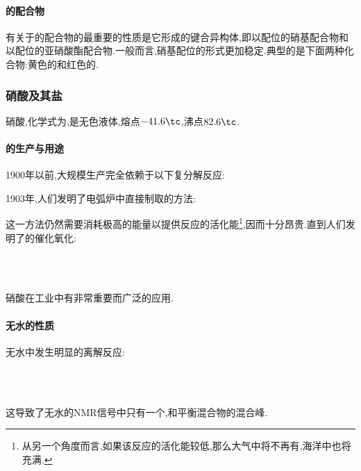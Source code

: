 \documentclass{ctexbook}
\begin{document}
\paragraph{的配合物}
有关于的配合物的最重要的性质是它形成的键合异构体,即以配位的硝基配合物和以配位的亚硝酸酯配合物.一般而言,硝基配位的形式更加稳定.典型的是下面两种化合物:黄色的和红色的.

\subsubsection{硝酸及其盐}
\begin{substance}[\ce{HNO3}]
    硝酸,化学式为,是无色液体,熔点$-41.6\tc$,沸点$82.6\tc$.
\end{substance}
\paragraph{的生产与用途}
1900年以前,大规模生产完全依赖于以下复分解反应:
\begin{center}
\end{center}
1903年,人们发明了电弧炉中直接制取的方法:
\begin{center}
\end{center}
这一方法仍然需要消耗极高的能量以提供反应的活化能\footnote{从另一个角度而言,如果该反应的活化能较低,那么大气中将不再有,海洋中也将充满.},因而十分昂贵.直到人们发明了的催化氧化:
\begin{center}
    \\
    \\
\end{center}

\indent 硝酸在工业中有非常重要而广泛的应用.
\paragraph{无水的性质}
无水中发生明显的离解反应:
\begin{center}
    \\
    \\
\end{center}
这导致了无水的NMR信号中只有一个,和平衡混合物的混合峰.
\end{document}
